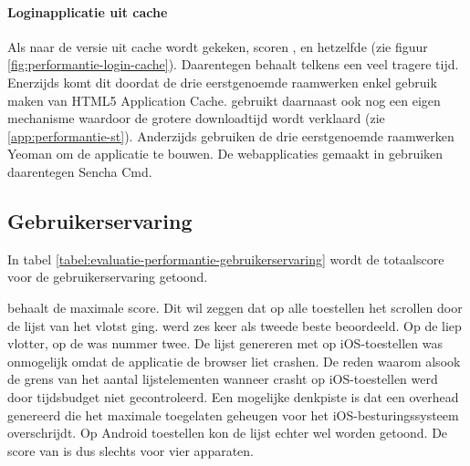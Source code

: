 \paragraph{Loginapplicatie uit cache}
Als naar de versie uit cache wordt gekeken, scoren \kendo{}, \jqm{} en \lungo{} hetzelfde (zie figuur \ref{fig:performantie-login-cache}).
Daarentegen behaalt \st{} telkens een veel tragere tijd.
Enerzijds komt dit doordat de drie eerstgenoemde raamwerken enkel gebruik maken van HTML5 Application Cache.
\st{} gebruikt daarnaast ook nog een eigen mechanisme waardoor de grotere downloadtijd wordt verklaard (zie \ref{app:performantie-st}).
Anderzijds gebruiken de drie eerstgenoemde raamwerken Yeoman om de applicatie te bouwen.
De webapplicaties gemaakt in \st{} gebruiken daarentegen Sencha Cmd.


\subsection{Gebruikerservaring}
\label{sec:evaluatie-gebruikerservaring}
In tabel \ref{tabel:evaluatie-performantie-gebruikerservaring} wordt de totaalscore voor de gebruikerservaring getoond.

\begin{table}
\centering
{}
\caption{Gebruikerservaring voor \st{}~(\sta), \kendo{}~(\kendoa), \jqm{}~(\jqma) en \lungo{}~(\lungoa).}
\label{tabel:evaluatie-performantie-gebruikerservaring}
\end{table}

\st{} behaalt de maximale score.
Dit wil zeggen dat op alle toestellen het scrollen door de lijst van \st{} het vlotst ging.
\jqm{} werd zes keer als tweede beste beoordeeld. 
Op de \htc{} liep \kendo{} vlotter,  op de \ipadi{} was \lungo{} nummer twee.
De lijst genereren met \kendo{} op iOS-toestellen was onmogelijk omdat de applicatie de browser liet crashen.
De reden waarom alsook de grens van het aantal lijstelementen wanneer \kendo{} crasht op iOS-toestellen werd door tijdsbudget niet gecontroleerd.
Een mogelijke denkpiste is dat \kendo{} een overhead genereerd die het maximale toegelaten geheugen voor het iOS-besturingssysteem overschrijdt.
Op Android toestellen kon de \kendo{} lijst echter wel worden getoond.
De score van \kendo{} is dus slechts voor vier apparaten.

